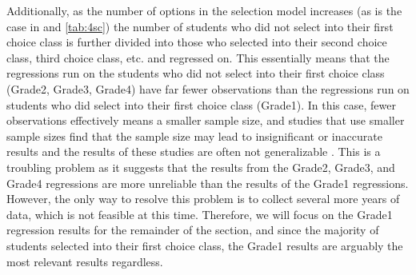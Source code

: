 Additionally, as the number of options in the selection model increases (as is the case in  and \ref{tab:4sc}) the number of students who did not select into their first choice class is further divided into those who selected into their second choice class, third choice class, etc. and regressed on. 
This essentially means that the regressions run on the students who did not select into their first choice class (Grade2, Grade3, Grade4) have far fewer observations than the regressions run on students who did select into their first choice class (Grade1). 
In this case, fewer observations effectively means a smaller sample size, and studies that use smaller sample sizes find that the sample size may lead to insignificant or inaccurate results \citep{gonzalez2013gibrat} and the results of these studies are often not generalizable \citep{oladipupo2013does}.
This is a troubling problem as it suggests that the results from the Grade2, Grade3, and Grade4 regressions are more unreliable than the results of the Grade1 regressions. 
However, the only way to resolve this problem is to collect several more years of data, which is not feasible at this time. 
Therefore, we will focus on the Grade1 regression results for the remainder of the section, and since the majority of students selected into their first choice class, the Grade1 results are arguably the most relevant results regardless. 

